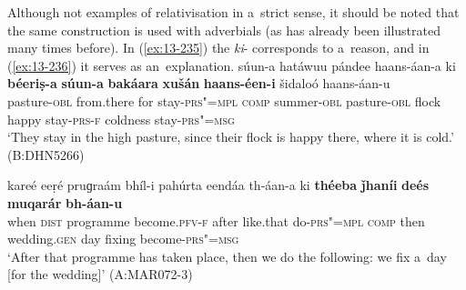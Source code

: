Although not examples of relativisation in a~strict sense, it should be noted that the same construction is used with  adverbials (as has already been illustrated many times before). In (\ref{ex:13-235}) the \textit{ki}- corresponds to a~reason, and in (\ref{ex:13-236}) it serves as an~explanation.
\ea
\label{ex:13-235}
\gll súun-a hatáwuu pándee haans-áan-a ki \textbf{béeriṣ-a} \textbf{súun-a} \textbf{bakáara} \textbf{xušán} \textbf{haans-éen-i} šidaloó haans-áan-u\\
pasture-\textsc{obl} from.there for stay-\textsc{prs"=mpl} \textsc{comp}  summer-\textsc{obl} pasture-\textsc{obl} flock happy stay-\textsc{prs-f} coldness stay-\textsc{prs"=msg}\\
\glt `They stay in the high pasture, since their flock is happy there, where it is cold.' (B:DHN5266)

\ex
\label{ex:13-236}
\gll kareé eeṛé pruɡraám bhíl-i pahúrta eendáa  th-áan-a ki \textbf{théeba} \textbf{ǰhaníi} \textbf{deés} \textbf{muqarár} \textbf{bh-áan-u}\\
when \textsc{dist} programme become.\textsc{pfv-f} after like.that do-\textsc{prs"=mpl} \textsc{comp} then wedding.\textsc{gen} day fixing become-\textsc{prs"=msg}\\
\glt `After that programme has taken place, then we do the following: we fix a~day [for the wedding]' (A:MAR072-3)
\z